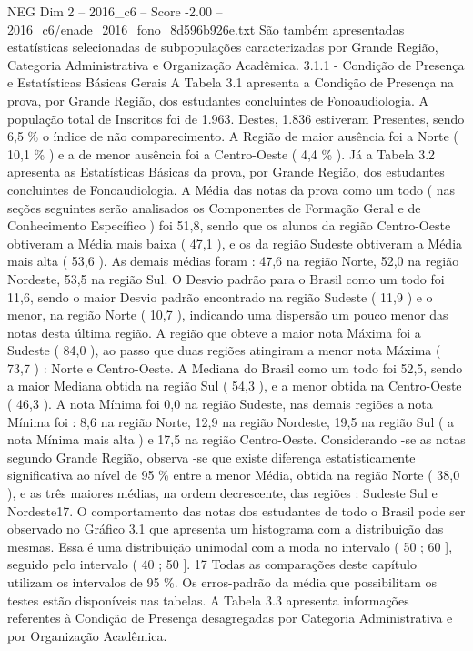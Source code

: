 \begin{textsample}{NEG Dim 2 – 2016\_c6 – Score -2.00 – 2016\_c6/enade\_2016\_fono\_8d596b926e.txt}
São também apresentadas estatísticas selecionadas de subpopulações caracterizadas por Grande Região, Categoria Administrativa e Organização Acadêmica. 3.1.1 - Condição de Presença e Estatísticas Básicas Gerais A Tabela 3.1 apresenta a Condição de Presença na prova, por Grande Região, dos estudantes concluintes de Fonoaudiologia.
A população total de Inscritos foi de 1.963.
Destes, 1.836 estiveram Presentes, sendo 6,5 \% o índice de não comparecimento.
A Região de maior ausência foi a Norte ( 10,1 \% ) e a de menor ausência foi a Centro-Oeste ( 4,4 \% ).
Já a Tabela 3.2 apresenta as Estatísticas Básicas da prova, por Grande Região, dos estudantes concluintes de Fonoaudiologia.
A Média das notas da prova como um todo ( nas seções seguintes serão analisados os Componentes de Formação Geral e de Conhecimento Específico ) foi 51,8, sendo que os alunos da região Centro-Oeste obtiveram a Média mais baixa ( 47,1 ), e os da região Sudeste obtiveram a Média mais alta ( 53,6 ).
As demais médias foram : 47,6 na região Norte, 52,0 na região Nordeste, 53,5 na região Sul.
O Desvio padrão para o Brasil como um todo foi 11,6, sendo o maior Desvio padrão encontrado na região Sudeste ( 11,9 ) e o menor, na região Norte ( 10,7 ), indicando uma dispersão um pouco menor das notas desta última região.
A região que obteve a maior nota Máxima foi a Sudeste ( 84,0 ), ao passo que duas regiões atingiram a menor nota Máxima ( 73,7 ) : Norte e Centro-Oeste.
A Mediana do Brasil como um todo foi 52,5, sendo a maior Mediana obtida na região Sul ( 54,3 ), e a menor obtida na Centro-Oeste ( 46,3 ).
A nota Mínima foi 0,0 na região Sudeste, nas demais regiões a nota Mínima foi : 8,6 na região Norte, 12,9 na região Nordeste, 19,5 na região Sul ( a nota Mínima mais alta ) e 17,5 na região Centro-Oeste.
Considerando -se as notas segundo Grande Região, observa -se que existe diferença estatisticamente significativa ao nível de 95 \% entre a menor Média, obtida na região Norte ( 38,0 ), e as três maiores médias, na ordem decrescente, das regiões : Sudeste Sul e Nordeste17.
O comportamento das notas dos estudantes de todo o Brasil pode ser observado no Gráfico 3.1 que apresenta um histograma com a distribuição das mesmas.
Essa é uma distribuição unimodal com a moda no intervalo ( 50 ; 60 ], seguido pelo intervalo ( 40 ; 50 ]. 17 Todas as comparações deste capítulo utilizam os intervalos de 95 \%.
Os erros-padrão da média que possibilitam os testes estão disponíveis nas tabelas.
A Tabela 3.3 apresenta informações referentes à Condição de Presença desagregadas por Categoria Administrativa e por Organização Acadêmica.

\end{textsample}
